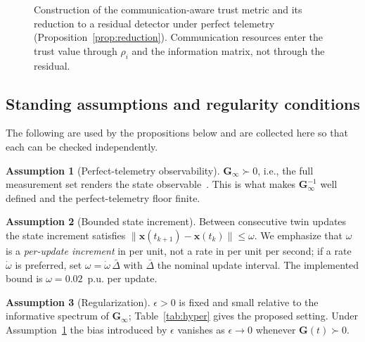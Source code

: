 \documentclass[journal]{IEEEtran}
\theoremstyle{plain}
\theoremstyle{definition}
\newtheorem{assumption}{Assumption}
\theoremstyle{remark}
\newcommand{\bx}{\mathbf{x}}
\newcommand{\bG}{\mathbf{G}}
\begin{document}
\begin{figure}[!t]
{}
\caption{Construction of the communication-aware trust metric and its
reduction to a residual detector under perfect telemetry
(Proposition~\ref{prop:reduction}). Communication resources enter the
trust value through $\rho_i$ and the information matrix, not through the
residual.}
\label{fig:blockdiagram}
\end{figure}

\subsection{Standing assumptions and regularity conditions}
\label{sec:assumptions}
The following are used by the propositions below and are collected here so
that each can be checked independently.

\begin{assumption}[Perfect-telemetry observability]
\label{as:obs}
$\bG_{\infty}\succ0$, i.e., the full measurement set renders the state
observable~\cite{monticelli1985}. This is what makes $\bG_{\infty}^{-1}$
well defined and the perfect-telemetry floor finite.
\end{assumption}

\begin{assumption}[Bounded state increment]
\label{as:omega}
Between consecutive twin updates the state increment satisfies
$\lVert\bx(t_{k+1})-\bx(t_k)\rVert\le\omega$. We emphasize that $\omega$
is a \emph{per-update increment} in per unit, not a rate in per unit per
second; if a rate $\dot\omega$ is preferred, set
$\omega=\dot\omega\,\bar\Delta$ with $\bar\Delta$ the nominal update
interval. The implemented bound is $\omega=0.02$~p.u. per update.
\end{assumption}

\begin{assumption}[Regularization]
\label{as:eps}
$\epsilon>0$ is fixed and small relative to the informative spectrum of
$\bG_{\infty}$; Table~\ref{tab:hyper} gives the proposed setting. Under
Assumption~\ref{as:obs} the bias introduced by $\epsilon$ vanishes as
$\epsilon\to0$ whenever $\bG(t)\succ0$.
\end{assumption}
\end{document}
